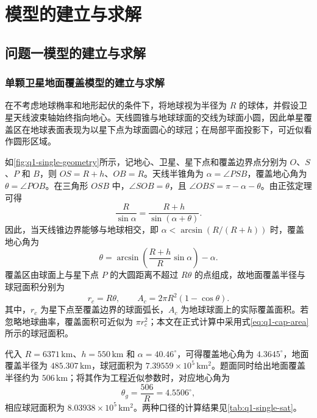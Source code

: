\documentclass[withoutpreface,bwprint]{cumcmthesis} %
\begin{document}
\section{模型的建立与求解}
\subsection{问题一模型的建立与求解}
\subsubsection{单颗卫星地面覆盖模型的建立与求解}
在不考虑地球椭率和地形起伏的条件下，将地球视为半径为 $R$ 的球体，并假设卫星天线波束轴始终指向地心。天线圆锥与地球球面的交线为球面小圆，因此单星覆盖区在地球表面表现为以星下点为球面圆心的球冠；在局部平面投影下，可近似看作圆形区域。

如\cref{fig:q1-single-geometry}所示，记地心、卫星、星下点和覆盖边界点分别为 $O$、$S$、$P$ 和 $B$，则 $OS=R+h$、$OB=R$。天线半锥角为 $\alpha=\angle PSB$，覆盖地心角为 $\theta=\angle POB$。在三角形 $OSB$ 中，$\angle SOB=\theta$，且 $\angle OBS=\pi-\alpha-\theta$。由正弦定理可得
\begin{equation}
    \frac{R}{\sin\alpha}
    =\frac{R+h}{\sin(\alpha+\theta)}.
    \label{eq:q1-sine-law}
\end{equation}
因此，当天线锥边界能够与地球相交，即 $\alpha<\arcsin\!\left(R/(R+h)\right)$ 时，覆盖地心角为
\begin{equation}
    \theta=\arcsin\left(\frac{R+h}{R}\sin\alpha\right)-\alpha .
    \label{eq:q1-theta-alpha}
\end{equation}
覆盖区由球面上与星下点 $P$ 的大圆距离不超过 $R\theta$ 的点组成，故地面覆盖半径与球冠面积分别为
\begin{equation}
    r_c=R\theta,\qquad A_c=2\pi R^2(1-\cos\theta).
    \label{eq:q1-cap-area}
\end{equation}
其中，$r_c$ 为星下点至覆盖边界的球面弧长，$A_c$ 为地球球面上的实际覆盖面积。若忽略地球曲率，覆盖面积可近似为 $\pi r_c^2$；本文在正式计算中采用式\eqref{eq:q1-cap-area}所示的球冠面积。

代入 $R=6371\,\mathrm{km}$、$h=550\,\mathrm{km}$ 和 $\alpha=40.46^\circ$，可得覆盖地心角为 $4.3645^\circ$，地面覆盖半径为 $485.307\,\mathrm{km}$，球冠面积为 $7.39559\times10^5\,\mathrm{km^2}$。题面同时给出地面覆盖半径约为 $506\,\mathrm{km}$；将其作为工程近似参数时，对应地心角为
\begin{equation}
    \theta_g=\frac{506}{R}=4.5506^\circ,
    \label{eq:q1-theta-given}
\end{equation}
相应球冠面积为 $8.03938\times10^5\,\mathrm{km^2}$。两种口径的计算结果见\cref{tab:q1-single-sat}。
\end{document}
